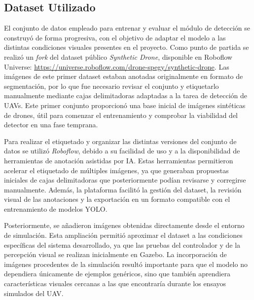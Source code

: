 \vspace{0.3cm}

\subsection{Dataset Utilizado}

El conjunto de datos empleado para entrenar y evaluar el módulo de detección se construyó de forma progresiva, con el objetivo de adaptar el modelo a las distintas condiciones visuales presentes en el proyecto. Como punto de partida se realizó un \textit{fork} del dataset público \textit{Synthetic Drone}, disponible en Roboflow Universe: \url{https://universe.roboflow.com/drone-spegy/synthetic-drone}. Las imágenes de este primer dataset estaban anotadas originalmente en formato de segmentación, por lo que fue necesario revisar el conjunto y etiquetarlo manualmente mediante cajas delimitadoras adaptadas a la tarea de detección de UAVs. Este primer conjunto proporcionó una base inicial de imágenes sintéticas de drones, útil para comenzar el entrenamiento y comprobar la viabilidad del detector en una fase temprana.

\vspace{0.3cm}

Para realizar el etiquetado y organizar las distintas versiones del conjunto de datos se utilizó \textit{Roboflow}, debido a su facilidad de uso y a la disponibilidad de herramientas de anotación asistidas por IA. Estas herramientas permitieron acelerar el etiquetado de múltiples imágenes, ya que generaban propuestas iniciales de cajas delimitadoras que posteriormente podían revisarse y corregirse manualmente. Además, la plataforma facilitó la gestión del dataset, la revisión visual de las anotaciones y la exportación en un formato compatible con el entrenamiento de modelos YOLO.

\vspace{0.3cm}

Posteriormente, se añadieron imágenes obtenidas directamente desde el entorno de simulación. Esta ampliación permitió aproximar el dataset a las condiciones específicas del sistema desarrollado, ya que las pruebas del controlador y de la percepción visual se realizan inicialmente en Gazebo. La incorporación de imágenes procedentes de la simulación resultó importante para que el modelo no dependiera únicamente de ejemplos genéricos, sino que también aprendiera características visuales cercanas a las que encontraría durante los ensayos simulados del UAV.

